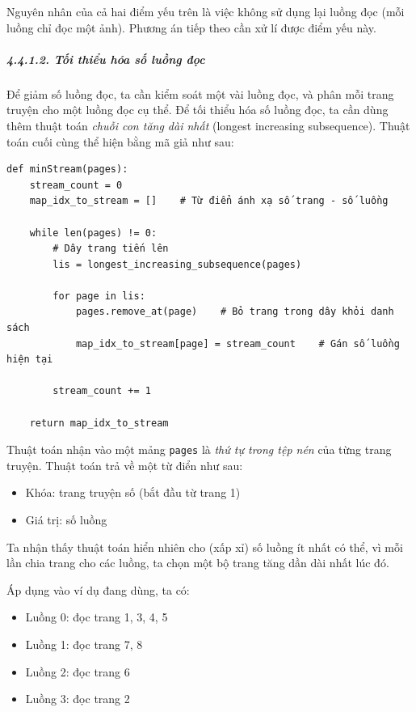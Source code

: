 \documentclass[
]{article}
\begin{document}
Nguyên nhân của cả hai điểm yếu trên là việc không sử dụng lại luồng đọc
(mỗi luồng chỉ đọc một ảnh). Phương án tiếp theo cần xử lí được điểm yếu
này.

\hypertarget{tux1ed1i-thiux1ec3u-huxf3a-sux1ed1-luux1ed3ng-ux111ux1ecdc}{%
\subparagraph{4.4.1.2. Tối thiểu hóa số luồng
đọc}\label{tux1ed1i-thiux1ec3u-huxf3a-sux1ed1-luux1ed3ng-ux111ux1ecdc}}

Để giảm số luồng đọc, ta cần kiểm soát một vài luồng đọc, và phân mỗi
trang truyện cho một luồng đọc cụ thể. Để tối thiểu hóa số luồng đọc, ta
cần dùng thêm thuật toán \emph{chuỗi con tăng dài nhất} (longest
increasing subsequence). Thuật toán cuối cùng thể hiện bằng mã giả như
sau:

\begin{verbatim}
def minStream(pages):
    stream_count = 0
    map_idx_to_stream = []    # Từ điển ánh xạ số trang - số luồng

    while len(pages) != 0:
        # Dây trang tiến lên
        lis = longest_increasing_subsequence(pages)

        for page in lis:
            pages.remove_at(page)    # Bỏ trang trong dây khỏi danh sách
            map_idx_to_stream[page] = stream_count    # Gán số luồng hiện tại

        stream_count += 1

    return map_idx_to_stream
\end{verbatim}

Thuật toán nhận vào một mảng \texttt{pages} là \emph{thứ tự trong tệp
nén} của từng trang truyện. Thuật toán trả về một từ điển như sau:

\begin{itemize}
\item
  Khóa: trang truyện số (bắt đầu từ trang 1)
\item
  Giá trị: số luồng
\end{itemize}

Ta nhận thấy thuật toán hiển nhiên cho (xấp xỉ) số luồng ít nhất có thể,
vì mỗi lần chia trang cho các luồng, ta chọn một bộ trang tăng dần dài
nhất lúc đó.

Áp dụng vào ví dụ đang dùng, ta có:

\begin{itemize}
\item
  Luồng 0: đọc trang 1, 3, 4, 5
\item
  Luồng 1: đọc trang 7, 8
\item
  Luồng 2: đọc trang 6
\item
  Luồng 3: đọc trang 2
\end{itemize}
\end{document}
